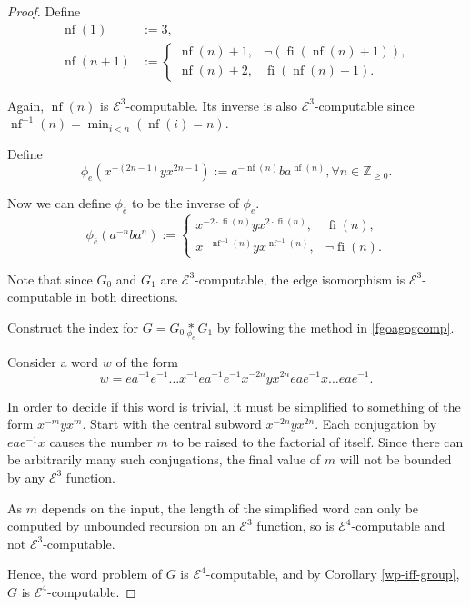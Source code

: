 \documentclass[a4paper]{article}
\newcommand{\grz}[1]{$\mathcal{E}^{#1}$}	%
\newcommand{\ZZ}{\mathbb{Z}}
\newcommand{\recur}[1]{\begin{equation} \begin{split} #1 \end{split} \end{equation}}	%
\theoremstyle{plain}
\theoremstyle{definition}
\begin{document}
\begin{proof}
Define 
\recur{
	\operatorname{nf}(1) &:= 3, \\
	\operatorname{nf}(n+1) &:= 
		\begin{cases}
			\operatorname{nf}(n)+1, & \neg(\operatorname{fi}(\operatorname{nf}(n)+1)), \\
			\operatorname{nf}(n)+2, & \operatorname{fi}(\operatorname{nf}(n)+1).
		\end{cases}
}

Again, $\operatorname{nf}(n)$ is \grz{3}-computable. Its inverse is also \grz{3}-computable since $\operatorname{nf}^{-1}(n) = \min_{i<n} (\operatorname{nf}(i) = n)$.

Define
\[ \phi_{e}(x^{-(2n-1)}yx^{2n-1}) := a^{-\operatorname{nf}(n)}ba^{\operatorname{nf}(n)}, \forall n \in \ZZ_{\geq 0}. \]

Now we can define $\phi_{\bar{e}}$ to be the inverse of $\phi_e$.
\[ 
	\phi_{\bar{e}}(a^{-n}ba^n) := 
		\begin{cases}
			x^{-2 \cdot \operatorname{fi}(n)}yx^{2 \cdot \operatorname{fi}(n)}, & \operatorname{fi}(n), \\
			x^{-\operatorname{nf}^{-1}(n)}yx^{\operatorname{nf}^{-1}(n)}, & \neg \operatorname{fi}(n).
		\end{cases}
\]

Note that since $G_0$ and $G_1$ are \grz{3}-computable, the edge isomorphism is \grz{3}-computable in both directions.

Construct the index for $G = G_0 \underset{\phi_e}{\ast} G_1$ by following the method in \ref{fgoagogcomp}.

Consider a word $w$ of the form
\[ w = ea^{-1}e^{-1} \dots x^{-1}ea^{-1}e^{-1}x^{-2n}yx^{2n}eae^{-1}x \dots eae^{-1}. \]

In order to decide if this word is trivial, it must be simplified to something of the form $x^{-m}yx^m$. Start with the central subword $x^{-2n}yx^{2n}$. Each conjugation by $eae^{-1}x$ causes the number $m$ to be raised to the factorial of itself. Since there can be arbitrarily many such conjugations, the final value of $m$ will not be bounded by any \grz{3} function.

As $m$ depends on the input, the length of the simplified word can only be computed by unbounded recursion on an \grz{3} function, so is \grz{4}-computable and not \grz{3}-computable. 

Hence, the word problem of $G$ is \grz{4}-computable, and by Corollary \ref{wp-iff-group}, $G$ is \grz{4}-computable. 
\end{proof}
\end{document}
